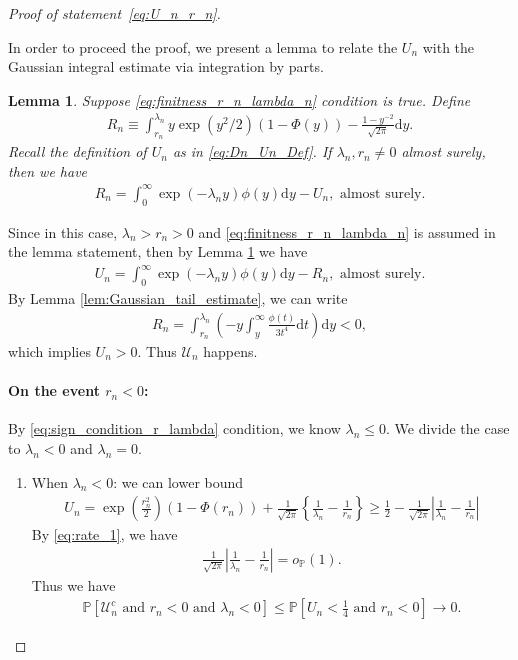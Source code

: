 \documentclass[12pt]{article}
\newtheorem{lemma}{Lemma}
\theoremstyle{definition}
\def\P{\mathbb{P}}
\def\P{\mathbb{P}}
\renewcommand{\P}{\mathbb{P}}							%
\begin{document}
\begin{proof}[Proof of statement~\eqref{eq:U_n_r_n}]
\begin{enumerate}
		In order to proceed the proof, we present a lemma to relate the $U_n$ with the Gaussian integral estimate via integration by parts.
		
		\begin{lemma}\label{lem:R_n_formula}
			Suppose \eqref{eq:finitness_r_n_lambda_n} condition is true. Define 
			\begin{align}\label{eq:R_n_def}
				R_n\equiv \int_{r_n}^{\lambda_n}
				y\exp(y^2/2)(1-\Phi(y))-\frac{1-y^{-2}}{\sqrt{2\pi}}
				\mathrm{d}y.
			\end{align}
			Recall the definition of $U_n$ as in \eqref{eq:Dn_Un_Def}. If $\lambda_n,r_n\neq 0$ almost surely, then we have
			\begin{align*}
				R_n=\int_{0}^{\infty}\exp(-\lambda_n y)\phi(y)\mathrm{d}y-U_n,\text{ almost surely}.
			\end{align*}
		\end{lemma}
		Since in this case, $\lambda_n>r_n>0$ and \eqref{eq:finitness_r_n_lambda_n} is assumed in the lemma statement, then by Lemma \ref{lem:R_n_formula} we have 
		\begin{align*}
			U_n=\int_{0}^{\infty}\exp(-\lambda_n y)\phi(y)\mathrm{d}y-R_n,\text{ almost surely}.
		\end{align*}
		By Lemma \ref{lem:Gaussian_tail_estimate},
		we can write 
		\begin{align*}
			R_n = \int_{r_n}^{\lambda_n} \left(-y\int_{y}^{\infty}\frac{\phi(t)}{3t^4}\mathrm{d}t\right)\mathrm{d}y<0,
		\end{align*}
		which implies $U_n>0$. Thus $\mathcal{U}_n$ happens.
	\end{enumerate}

	\paragraph{On the event $r_n<0$:}
	By \eqref{eq:sign_condition_r_lambda} condition, we know $\lambda_n\leq 0$. We divide the case to $\lambda_n<0$ and $\lambda_n=0$.

	\begin{enumerate}
		\item When $\lambda_n<0$: we can lower bound 
		\begin{align*}
			U_n=\exp\left(\frac{r_n^2}{2}\right)(1-\Phi(r_n))+
			\frac{1}{\sqrt{2\pi}}\left\{\frac{1}{\lambda_n}-\frac{1}{r_n}\right\}\geq \frac{1}{2} -\frac{1}{\sqrt{2\pi}}\left|\frac{1}{\lambda_n}-\frac{1}{r_n}\right|
		\end{align*}
		By \eqref{eq:rate_1}, we have 
		\begin{align*}
			\frac{1}{\sqrt{2\pi}}\left|\frac{1}{\lambda_n}-\frac{1}{r_n}\right|=o_{\P}(1).
		\end{align*}
		Thus we have
		\begin{align*}
			\P\left[\mathcal{U}_n^c\text{ and } r_n<0\text{ and } \lambda_n<0\right]\leq \P\left[U_n< \frac{1}{4}\text{ and } r_n<0\right]\rightarrow0.
		\end{align*}


\end{enumerate}
\end{proof}
\end{document}
